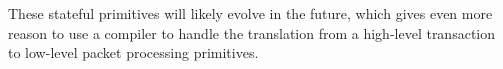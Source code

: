 
These stateful primitives will likely evolve in the future, which gives even
more reason to use a compiler to handle the translation from a high-level
transaction to low-level packet processing primitives.
